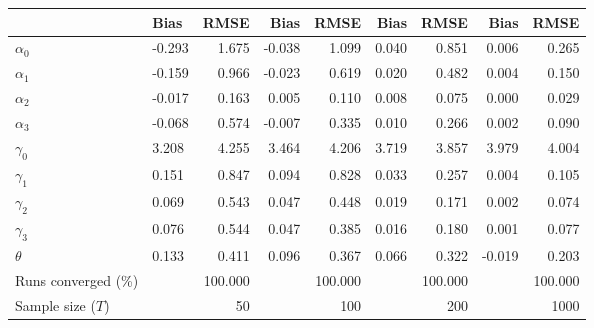 
\begin{tabular}[t]{llrrrrrrr}
\toprule
  & Bias & RMSE & Bias & RMSE & Bias & RMSE & Bias & RMSE\\
\midrule
$\alpha_{0}$ & -0.293 & 1.675 & -0.038 & 1.099 & 0.040 & 0.851 & 0.006 & 0.265\\
$\alpha_{1}$ & -0.159 & 0.966 & -0.023 & 0.619 & 0.020 & 0.482 & 0.004 & 0.150\\
$\alpha_{2}$ & -0.017 & 0.163 & 0.005 & 0.110 & 0.008 & 0.075 & 0.000 & 0.029\\
$\alpha_{3}$ & -0.068 & 0.574 & -0.007 & 0.335 & 0.010 & 0.266 & 0.002 & 0.090\\
$\gamma_{0}$ & 3.208 & 4.255 & 3.464 & 4.206 & 3.719 & 3.857 & 3.979 & 4.004\\
$\gamma_{1}$ & 0.151 & 0.847 & 0.094 & 0.828 & 0.033 & 0.257 & 0.004 & 0.105\\
$\gamma_{2}$ & 0.069 & 0.543 & 0.047 & 0.448 & 0.019 & 0.171 & 0.002 & 0.074\\
$\gamma_{3}$ & 0.076 & 0.544 & 0.047 & 0.385 & 0.016 & 0.180 & 0.001 & 0.077\\
$\theta$ & 0.133 & 0.411 & 0.096 & 0.367 & 0.066 & 0.322 & -0.019 & 0.203\\
Runs converged (\%) &  & 100.000 &  & 100.000 &  & 100.000 &  & 100.000\\
Sample size ($T$) &  & 50 &  & 100 &  & 200 &  & 1000\\
\bottomrule
\end{tabular}
